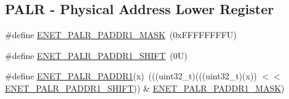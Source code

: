 \subsection*{P\+A\+LR -\/ Physical Address Lower Register}
\begin{DoxyCompactItemize}
\item 
\#define \mbox{\hyperlink{group___e_n_e_t___register___masks_gac4233569659da9e3d013421bd1e12b49}{E\+N\+E\+T\+\_\+\+P\+A\+L\+R\+\_\+\+P\+A\+D\+D\+R1\+\_\+\+M\+A\+SK}}~(0x\+F\+F\+F\+F\+F\+F\+F\+F\+U)
\item 
\#define \mbox{\hyperlink{group___e_n_e_t___register___masks_gad11fbf90382ecfe565772e12e3997557}{E\+N\+E\+T\+\_\+\+P\+A\+L\+R\+\_\+\+P\+A\+D\+D\+R1\+\_\+\+S\+H\+I\+FT}}~(0\+U)
\item 
\#define \mbox{\hyperlink{group___e_n_e_t___register___masks_ga990e2f0f1e734c1bfd249159926a49c3}{E\+N\+E\+T\+\_\+\+P\+A\+L\+R\+\_\+\+P\+A\+D\+D\+R1}}(x)~(((uint32\+\_\+t)(((uint32\+\_\+t)(x)) $<$$<$ \mbox{\hyperlink{group___e_n_e_t___register___masks_gad11fbf90382ecfe565772e12e3997557}{E\+N\+E\+T\+\_\+\+P\+A\+L\+R\+\_\+\+P\+A\+D\+D\+R1\+\_\+\+S\+H\+I\+FT}})) \& \mbox{\hyperlink{group___e_n_e_t___register___masks_gac4233569659da9e3d013421bd1e12b49}{E\+N\+E\+T\+\_\+\+P\+A\+L\+R\+\_\+\+P\+A\+D\+D\+R1\+\_\+\+M\+A\+SK}})
\end{DoxyCompactItemize}
